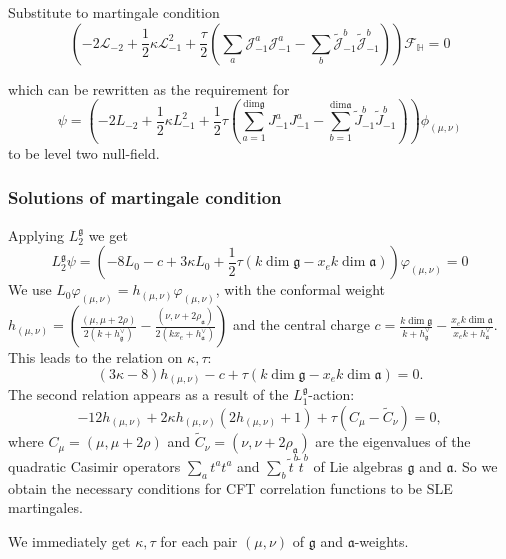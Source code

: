 \documentclass[pdftex]{beamer}
\newcommand{\gf}{\mathfrak{g}}
\newcommand{\af}{\mathfrak{a}}
\theoremstyle{definition} \newtheorem{Def}{Definition}
\begin{document}
\begin{frame}
Substitute to martingale condition
  \begin{equation*}
    \left(-2 \mathcal{L}_{-2}+\frac{1}{2}\kappa \mathcal{L}_{-1}^{2}+\frac{\tau}{2}\left( \sum_{a} \mathcal{J}^{a}_{-1} \mathcal{J}^{a}_{-1}-
        \sum_{b}\tilde{\mathcal{J}}^{b}_{-1} \tilde{\mathcal{J}}^{b}_{-1}\right)\right)        \mathcal{F}_{\mathbb{H}}=0
  \end{equation*}

which can be rewritten as the requirement for
\begin{equation*}
  \psi=\left(-2L_{-2}+\frac{1}{2}\kappa L_{-1}^{2}+\frac{1}{2}\tau \left(\sum_{a=1}^{\mathrm{dim}\gf}J^{a}_{-1}J^{a}_{-1}-\sum_{b=1}^{\mathrm{dim}\af}\tilde{J}^{b}_{-1}\tilde{J}^{b}_{-1}\right)\right) \phi_{(\mu,\nu)}
\end{equation*}
to be level two null-field.
\end{frame}

\begin{frame}
  \frametitle{Solutions of martingale condition}
  Applying $L_{2}^{\gf}$ we get
  \begin{equation*}
    L_{2}^{\gf}\psi= \left(-8 L_{0}-c+ 3 \kappa L_{0}+\frac{1}{2}\tau (k \dim\gf-x_{e}k\dim\af)\right) \varphi_{(\mu,\nu)}=0
  \end{equation*}
  We use $L_{0} \varphi_{(\mu,\nu)}=h_{(\mu,\nu)} \varphi_{(\mu,\nu)}$, with the conformal weight  $h_{(\mu,\nu)}= \left(\frac{(\mu,\mu+2\rho)}{2(k+h^{\vee}_{\gf})}-\frac{(\nu,\nu+2\rho_{\af})}{2(k x_{e}+h^{\vee}_{\af})}\right)$ and the central charge $c=\frac{k\dim \gf}{k+h^{\vee}_{\gf}}-\frac{x_{e}k\dim \af}{x_{e} k+h^{\vee}_{\af}}$. This leads to the relation on $\kappa,\tau$:
  \begin{equation*}
    \label{eq:28} (3\kappa-8)h_{(\mu,\nu)}-c+\tau (k\dim\gf-x_{e}k\dim\af) =0.
  \end{equation*}
  The second relation appears as a result of the $L_{1}^{\gf}$-action:
  \begin{equation*}
    \label{eq:21}
    -12 h_{(\mu,\nu)}+2\kappa h_{(\mu,\nu)} (2h_{(\mu,\nu)}+1) + \tau
    (C_{\mu}-\tilde{C}_{\nu})=0,
  \end{equation*}
  where $C_{\mu}=(\mu,\mu+2\rho)$ and $\tilde{C}_{\nu}=(\nu,\nu+2\rho_{\af})$ are the eigenvalues of the quadratic Casimir operators $\sum_{a}t^{a}t^{a}$ and $\sum_{b}\tilde{t}^{b}\tilde{t}^{b}$ of Lie algebras $\gf$ and $\af$.
  So we obtain the necessary conditions for CFT correlation functions to be SLE martingales. 

  We immediately get $\kappa,\tau$ for each pair $(\mu,\nu)$ of $\gf$ and $\af$-weights. 

\end{frame}
\end{document}
